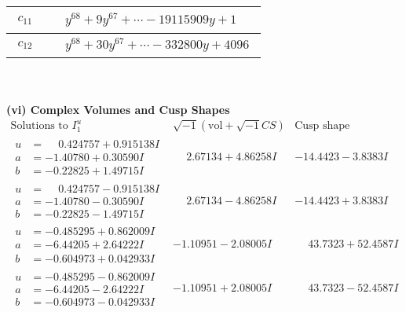 \documentclass[1p]{elsarticle_modified}
\theoremstyle{definition}
\newcommand{\I}{\sqrt{-1}}
\begin{document}
\begin{tabular}{m{50pt}|m{274pt}}
\hline $$\begin{aligned}c_{11}\end{aligned}$$&$\begin{aligned}
&y^{68}+9 y^{67}+\cdots-19115909 y+1
\end{aligned}$\\
\hline $$\begin{aligned}c_{12}\end{aligned}$$&$\begin{aligned}
&y^{68}+30 y^{67}+\cdots-332800 y+4096
\end{aligned}$\\
\hline
\end{tabular}\\~\\
\newpage\flushleft \textbf{(vi) Complex Volumes and Cusp Shapes}
$$\begin{array}{c|c|c}  
\text{Solutions to }I^u_{1}& \I (\text{vol} + \sqrt{-1}CS) & \text{Cusp shape}\\
 \hline 
\begin{aligned}
u &= \phantom{-}0.424757 + 0.915138 I \\
a &= -1.40780 + 0.30590 I \\
b &= -0.22825 + 1.49715 I\end{aligned}
 & \phantom{-}2.67134 + 4.86258 I & -14.4423 - 3.8383 I \\ \hline\begin{aligned}
u &= \phantom{-}0.424757 - 0.915138 I \\
a &= -1.40780 - 0.30590 I \\
b &= -0.22825 - 1.49715 I\end{aligned}
 & \phantom{-}2.67134 - 4.86258 I & -14.4423 + 3.8383 I \\ \hline\begin{aligned}
u &= -0.485295 + 0.862009 I \\
a &= -6.44205 + 2.64222 I \\
b &= -0.604973 + 0.042933 I\end{aligned}
 & -1.10951 - 2.08005 I & \phantom{-}43.7323 + 52.4587 I \\ \hline\begin{aligned}
u &= -0.485295 - 0.862009 I \\
a &= -6.44205 - 2.64222 I \\
b &= -0.604973 - 0.042933 I\end{aligned}
 & -1.10951 + 2.08005 I & \phantom{-}43.7323 - 52.4587 I \\ \hline\begin{aligned}

\end{aligned}
\end{array}$$
\end{document}
